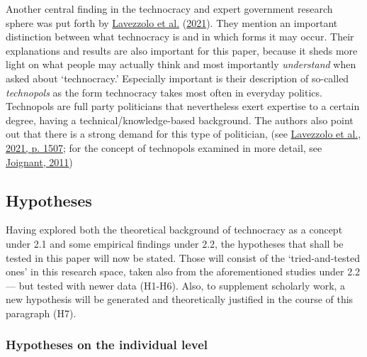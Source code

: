 \documentclass[
  12pt,
  english,
]{article}
\begin{document}
Another central finding in the technocracy and expert government
research sphere was put forth by
\protect\hyperlink{ref-lavezzolo2021will}{Lavezzolo et al.}
(\protect\hyperlink{ref-lavezzolo2021will}{2021}). They mention an
important distinction between what technocracy is and in which forms it
may occur. Their explanations and results are also important for this
paper, because it sheds more light on what people may actually think and
most importantly \emph{understand} when asked about `technocracy.'
Especially important is their description of so-called \emph{technopols}
as the form technocracy takes most often in everyday politics.
Technopols are full party politicians that nevertheless exert expertise
to a certain degree, having a technical/knowledge-based background. The
authors also point out that there is a strong demand for this type of
politician, (see \protect\hyperlink{ref-lavezzolo2021will}{Lavezzolo et
al., 2021, p. 1507}; for the concept of technopols examined in more
detail, see \protect\hyperlink{ref-joignant2011technopols}{Joignant,
2011})

\hypertarget{hypotheses}{%
\subsection{Hypotheses}\label{hypotheses}}

Having explored both the theoretical background of technocracy as a
concept under 2.1 and some empirical findings under 2.2, the hypotheses
that shall be tested in this paper will now be stated. Those will
consist of the `tried-and-tested ones' in this research space, taken
also from the aforementioned studies under 2.2 --- but tested with newer
data (H1-H6). Also, to supplement scholarly work, a new hypothesis will
be generated and theoretically justified in the course of this paragraph
(H7).

\hypertarget{hypotheses-on-the-individual-level}{%
\subsubsection{Hypotheses on the individual
level}\label{hypotheses-on-the-individual-level}}
\end{document}
